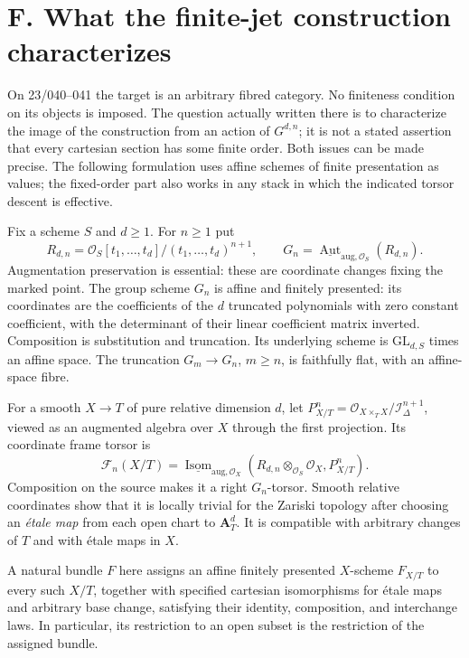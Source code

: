 \section{F. What the finite-jet construction characterizes}
\label{sec:geometry-F}

On 23/040--041 the target is an arbitrary fibred category. No finiteness
condition on its objects is imposed. The question actually written there is
to characterize the image of the construction from an action of
$G^{d,n}$; it is not a stated assertion that every cartesian section has some
finite order. Both issues can be made precise. The following formulation
uses affine schemes of finite presentation as values; the fixed-order part
also works in any stack in which the indicated torsor descent is effective.

Fix a scheme $S$ and $d\geq1$. For $n\geq1$ put
\[
 R_{d,n}=\mathcal O_S[t_1,\ldots,t_d]/(t_1,\ldots,t_d)^{n+1},\qquad
 G_n=\underline{\operatorname{Aut}}_{\mathrm{aug},\mathcal O_S}(R_{d,n}).
\]
Augmentation preservation is essential: these are coordinate changes fixing
the marked point. The group scheme $G_n$ is affine and finitely presented:
its coordinates are the coefficients of the $d$ truncated polynomials with
zero constant coefficient, with the determinant of their linear coefficient
matrix inverted. Composition is substitution and truncation. Its underlying
scheme is $\mathrm{GL}_{d,S}$ times an affine space. The truncation
$G_m\to G_n$, $m\geq n$, is faithfully flat, with an affine-space fibre.

For a smooth $X\to T$ of pure relative dimension $d$, let
$P^n_{X/T}=\mathcal O_{X\times_T X}/\mathcal I_\Delta^{n+1}$, viewed as an
augmented algebra over $X$ through the first projection. Its coordinate
frame torsor is
\[
 \mathcal F_n(X/T)=
 \underline{\operatorname{Isom}}_{\mathrm{aug},\mathcal O_X}
 (R_{d,n}\otimes_{\mathcal O_S}\mathcal O_X,P^n_{X/T}).
\]
Composition on the source makes it a right $G_n$-torsor. Smooth relative
coordinates show that it is locally trivial for the Zariski topology after
choosing an \emph{\'etale map} from each open chart to $\mathbf A^d_T$.
It is compatible with arbitrary changes of $T$ and with \'{e}tale maps in $X$.

A natural bundle $F$ here assigns an affine finitely presented $X$-scheme
$F_{X/T}$ to every such $X/T$, together with specified cartesian
isomorphisms for \'{e}tale maps and arbitrary base change, satisfying their
identity, composition, and interchange laws. In particular, its restriction
to an open subset is the restriction of the assigned bundle.

